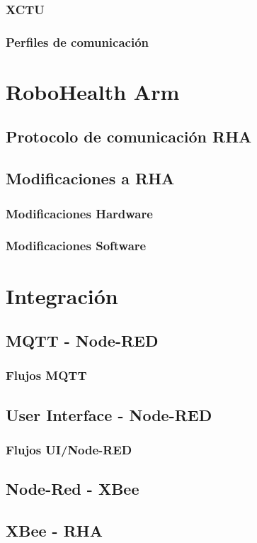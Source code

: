\subsubsection{XCTU}

\subsubsection{Perfiles de comunicación}


\section{RoboHealth Arm}

\subsection{Protocolo de comunicación RHA}

\subsection{Modificaciones a RHA}

\subsubsection{Modificaciones Hardware}

\subsubsection{Modificaciones Software}

\section{Integración}

\subsection{MQTT - Node-RED}

\subsubsection{Flujos MQTT}

\subsection{User Interface - Node-RED}

\subsubsection{Flujos UI/Node-RED}

\subsection{Node-Red - XBee}

\subsection{XBee - RHA}
